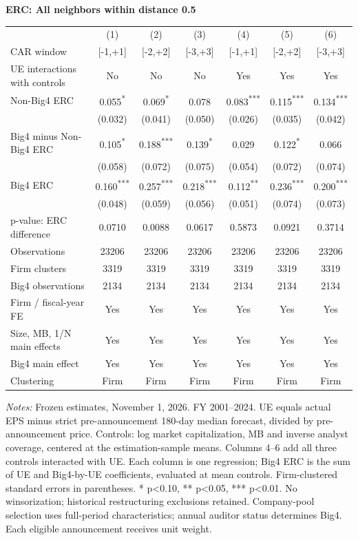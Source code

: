 \documentclass[10pt]{article}
\newcommand{\sym}[1]{\textsuperscript{#1}}
\begin{document}
\fontsize{10}{12}\selectfont
\noindent\textbf{ERC: All neighbors within distance 0.5}\par\medskip
\setlength{\tabcolsep}{3pt}\renewcommand{\arraystretch}{1.15}
\noindent\begin{tabular*}{\textwidth}{@{\extracolsep{\fill}}lcccccc@{}}
\toprule
 & (1) & (2) & (3) & (4) & (5) & (6) \\
CAR window & [-1,+1] & [-2,+2] & [-3,+3] & [-1,+1] & [-2,+2] & [-3,+3] \\
UE interactions with controls & No & No & No & Yes & Yes & Yes \\
\midrule
Non-Big4 ERC & 0.055\sym{*} & 0.069\sym{*} & 0.078\sym{} & 0.083\sym{***} & 0.115\sym{***} & 0.134\sym{***} \\
 & (0.032) & (0.041) & (0.050) & (0.026) & (0.035) & (0.042) \\
Big4 minus Non-Big4 ERC & 0.105\sym{*} & 0.188\sym{***} & 0.139\sym{*} & 0.029\sym{} & 0.122\sym{*} & 0.066\sym{} \\
 & (0.058) & (0.072) & (0.075) & (0.054) & (0.072) & (0.074) \\
Big4 ERC & 0.160\sym{***} & 0.257\sym{***} & 0.218\sym{***} & 0.112\sym{**} & 0.236\sym{***} & 0.200\sym{***} \\
 & (0.048) & (0.059) & (0.056) & (0.051) & (0.074) & (0.073) \\
p-value: ERC difference & 0.0710 & 0.0088 & 0.0617 & 0.5873 & 0.0921 & 0.3714 \\
Observations & 23206 & 23206 & 23206 & 23206 & 23206 & 23206 \\
Firm clusters & 3319 & 3319 & 3319 & 3319 & 3319 & 3319 \\
Big4 observations & 2134 & 2134 & 2134 & 2134 & 2134 & 2134 \\
Firm / fiscal-year FE & Yes & Yes & Yes & Yes & Yes & Yes \\
Size, MB, 1/N main effects & Yes & Yes & Yes & Yes & Yes & Yes \\
Big4 main effect & Yes & Yes & Yes & Yes & Yes & Yes \\
Clustering & Firm & Firm & Firm & Firm & Firm & Firm \\
\bottomrule
\end{tabular*}
\par\medskip\fontsize{9}{11}\selectfont\noindent\textit{Notes:} Frozen estimates, November 1, 2026. FY 2001--2024. UE equals actual EPS minus strict pre-announcement 180-day median forecast, divided by pre-announcement price. Controls: log market capitalization, MB and inverse analyst coverage, centered at the estimation-sample means. Columns 4--6 add all three controls interacted with UE. Each column is one regression; Big4 ERC is the sum of UE and Big4-by-UE coefficients, evaluated at mean controls. Firm-clustered standard errors in parentheses. * p<0.10, ** p<0.05, *** p<0.01. No winsorization; historical restructuring exclusions retained. Company-pool selection uses full-period characteristics; annual auditor status determines Big4. Each eligible announcement receives unit weight.
\end{document}
